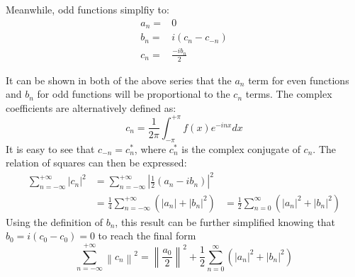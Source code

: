 \documentclass[twocolumn]{article}
\begin{document}
Meanwhile, odd functions simplfiy to:
\begin{equation}
	\begin{split}
		a_n =& 0 \\
		b_n =& i(c_n - c_{-n}) \\
		c_n =& \frac{-ib_n}{2}
	\end{split}
\end{equation} 

It can be shown in both of the above series that the $a_n$ term for even
functions and $b_n$ for odd functions will be proportional to the $c_n$ terms.
The complex coefficients are alternatively defined as:
\begin{equation}
	c_n = \frac{1}{2 \pi} \int_{-\pi}^{+\pi} f(x) e^{-inx} dx
\end{equation}
It is easy to see that $c_{-n} = c_n^{\ast}$, where $c_n^{\ast}$ is the complex
conjugate of $c_n$. The relation of squares can then be expressed:
\begin{equation}
	\begin{aligned}
		\sum_{n = -\infty}^{+\infty} \left| c_n \right|^2
		&= \sum_{n = -\infty}^{+\infty} \left| \frac{1}{2} (a_n - ib_n) \right|^2 \\
		&= \frac{1}{4} \sum_{n = -\infty}^{+\infty} \left(
		\left| a_n \right| + \left| b_n \right|^2
		\right)
		&= \frac{1}{2} \sum_{n=0}^{\infty} \left(
		\left| a_n \right|^2 + \left| b_n \right|^2
		\right)
	\end{aligned}
\end{equation}
Using the definition of $b_n$, this result can be further simplified knowing
that $b_0 = i(c_0 - c_0) = 0$ to reach the final form
\begin{equation}
	\sum_{n = -\infty}^{+\infty} \left\| c_n \right\|^2
	= \left\| \frac{a_0}{2} \right\|^2 + \frac{1}{2} \sum_{n=0}^{\infty} \left(
	\left| a_n \right|^2 + \left| b_n \right|^2
	\right)
\end{equation}


\end{document}
